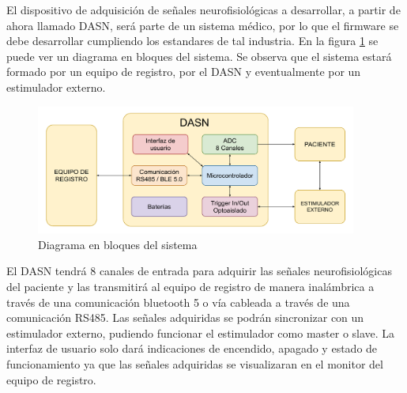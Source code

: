 \documentclass[
11pt, %
codirector, %
]{charter}
\begin{document}
El dispositivo de adquisición de señales neurofisiológicas a desarrollar, a partir de ahora llamado DASN, será parte de un sistema médico, por lo que el firmware se debe desarrollar cumpliendo los estandares de tal industria. En la figura \ref{fig:diagBloquesSistema} se puede ver un diagrama en bloques del sistema. Se observa que el sistema estará formado por un equipo de registro, por el DASN y eventualmente por un estimulador externo. 

\begin{figure}[htpb]
\centering 
\includegraphics[width=0.94\textwidth]{./Figuras/DiagramaEnBloquesDASN.pdf}
\caption{Diagrama en bloques del sistema}
\label{fig:diagBloquesSistema}
\end{figure}

El DASN tendrá 8 canales de entrada para adquirir las señales neurofisiológicas del paciente y las transmitirá al equipo de registro de manera inalámbrica a través de una comunicación bluetooth 5 o vía cableada a través de una comunicación RS485. Las señales adquiridas se podrán sincronizar con un estimulador externo, pudiendo funcionar el estimulador como master o slave. La interfaz de usuario solo dará indicaciones de encendido, apagado y estado de funcionamiento ya que las señales adquiridas se visualizaran en el monitor del equipo de registro.
\end{document}
